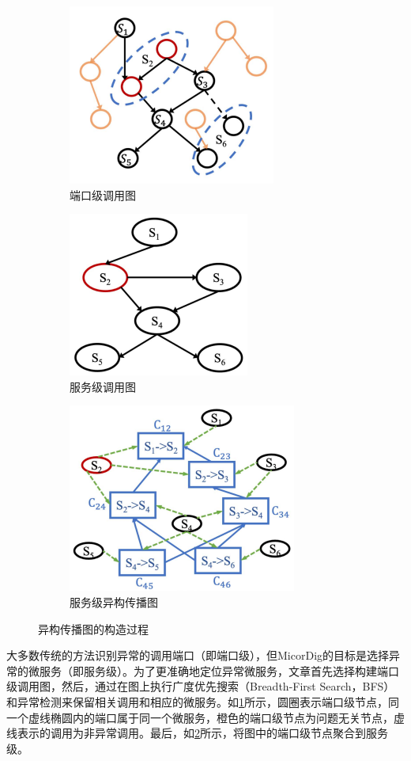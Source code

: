 \begin{figure}[ht]
    \centering
    \begin{subfigure}{0.32\linewidth}
        \centering
        \includegraphics[scale = 0.6]{img/port-level call graph.png}
        \caption{端口级调用图}
        \label{img:Port-level call graph}
    \end{subfigure}
    \begin{subfigure}{0.32\linewidth}
        \centering
        \includegraphics[scale = 0.6]{img/Service-level call graph.png}
        \caption{服务级调用图}
        \label{img:Service-level call graph}
    \end{subfigure}
    \begin{subfigure}{0.32\linewidth}
        \centering
        \includegraphics[scale = 0.55]{img/Service-level Heterogeneous Propagation Graph.png}
        \caption{服务级异构传播图}
        \label{img:Service-level Heterogeneous Propagation Graph}
    \end{subfigure}
    \caption{异构传播图的构造过程}
\end{figure}

大多数传统的方法识别异常的调用端口（即端口级），但MicorDig的目标是选择异常的微服务（即服务级）。为了更准确地定位异常微服务，文章首先选择构建端口级调用图，然后，通过在图上执行广度优先搜索（Breadth-First Search，BFS）和异常检测来保留相关调用和相应的微服务。如\cref{img:Port-level call graph}所示，圆圈表示端口级节点，同一个虚线椭圆内的端口属于同一个微服务，橙色的端口级节点为问题无关节点，虚线表示的调用为非异常调用。最后，如\cref{img:Service-level call graph}所示，将图中的端口级节点聚合到服务级。

